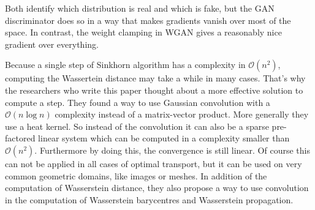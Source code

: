 Both identify which distribution is real and which is fake, but the GAN discriminator does so in a way that makes gradients vanish over most of the space. In contrast, the weight clamping in WGAN gives a reasonably nice gradient over everything.


Because a single step of Sinkhorn algorithm has a complexity in $\mathcal{O}(n^2)$, computing the Wassertein distance may take a while in many cases. That's why the researchers who write this paper thought about a more effective solution to compute a step. They found a way to use Gaussian convolution with a $\mathcal{O}(n \log n)$ complexity instead of a matrix-vector product. More generally they use a heat kernel. So instead of the convolution it can also be a sparse pre-factored linear system which can be computed in a complexity smaller than $\mathcal{O}(n^2)$. Furthermore by doing this, the convergence is still linear. Of course this can not be applied in all cases of optimal transport, but it can be used on very common geometric domains, like images or meshes. In addition of the computation of Wasserstein distance, they also propose a way to use convolution in the computation of Wasserstein barycentres and Wasserstein propagation.

